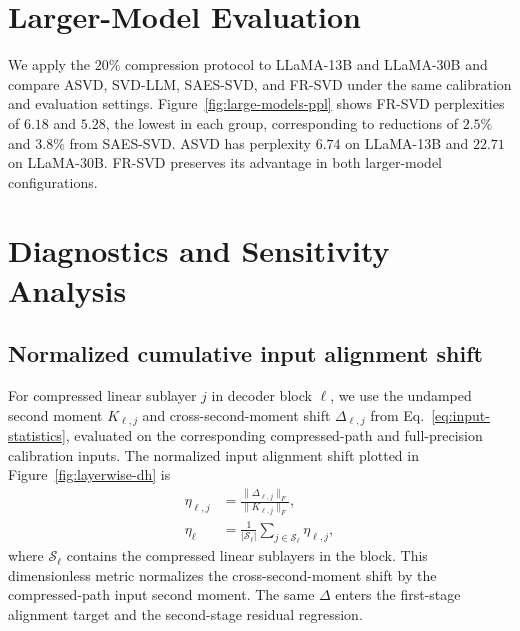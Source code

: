 \section{Larger-Model Evaluation}\label{app:full-results}\label{app:large-models}

We apply the $20\%$ compression protocol to LLaMA-13B and LLaMA-30B and compare ASVD, SVD-LLM, SAES-SVD, and FR-SVD under the same calibration and evaluation settings. Figure~\ref{fig:large-models-ppl} shows FR-SVD perplexities of $6.18$ and $5.28$, the lowest in each group, corresponding to reductions of $2.5\%$ and $3.8\%$ from SAES-SVD. ASVD has perplexity $6.74$ on LLaMA-13B and $22.71$ on LLaMA-30B. FR-SVD preserves its advantage in both larger-model configurations.



\section{Diagnostics and Sensitivity Analysis}\label{app:diagnostics}

\subsection{Normalized cumulative input alignment shift}\label{app:input-shift}
For compressed linear sublayer $j$ in decoder block $\ell$, we use the undamped second moment $K_{\ell,j}$ and cross-second-moment shift $\Delta_{\ell,j}$ from Eq.~\eqref{eq:input-statistics}, evaluated on the corresponding compressed-path and full-precision calibration inputs. The normalized input alignment shift plotted in Figure~\ref{fig:layerwise-dh} is
\begin{equation}
\begin{aligned}
\eta_{\ell,j}&=\frac{\|\Delta_{\ell,j}\|_F}{\|K_{\ell,j}\|_F},\\
\eta_\ell&=\frac1{|\mathcal S_\ell|}\sum_{j\in\mathcal S_\ell}\eta_{\ell,j},
\end{aligned}
\label{eq:app-input-shift}
\end{equation}
where $\mathcal S_\ell$ contains the compressed linear sublayers in the block. This dimensionless metric normalizes the cross-second-moment shift by the compressed-path input second moment. The same $\Delta$ enters the first-stage alignment target and the second-stage residual regression.

